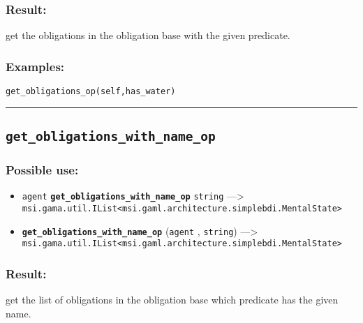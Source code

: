\documentclass[]{book}
\providecommand{\tightlist}{%
  \setlength{\itemsep}{0pt}\setlength{\parskip}{0pt}}
\theoremstyle{definition}
\theoremstyle{definition}
\theoremstyle{definition}
\theoremstyle{remark}
\begin{document}
\subsubsection{Result:}\label{result-217}

get the obligations in the obligation base with the given predicate.

\subsubsection{Examples:}\label{examples-170}

\begin{verbatim}
get_obligations_op(self,has_water) 
\end{verbatim}

\begin{center}\rule{0.5\linewidth}{\linethickness}\end{center}

\subsection{\texorpdfstring{\texttt{get\_obligations\_with\_name\_op}}{get\_obligations\_with\_name\_op}}\label{get_obligations_with_name_op}

\subsubsection{Possible use:}\label{possible-use-224}

\begin{itemize}
\tightlist
\item
  \texttt{agent} \textbf{\texttt{get\_obligations\_with\_name\_op}}
  \texttt{string} ---\textgreater{}
  \texttt{msi.gama.util.IList\textless{}msi.gaml.architecture.simplebdi.MentalState\textgreater{}}
\item
  \textbf{\texttt{get\_obligations\_with\_name\_op}} (\texttt{agent} ,
  \texttt{string}) ---\textgreater{}
  \texttt{msi.gama.util.IList\textless{}msi.gaml.architecture.simplebdi.MentalState\textgreater{}}
\end{itemize}

\subsubsection{Result:}\label{result-218}

get the list of obligations in the obligation base which predicate has
the given name.
\end{document}
